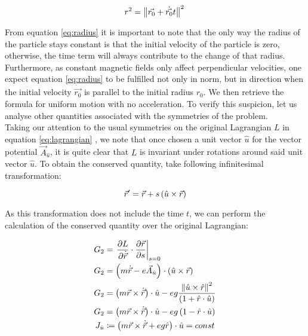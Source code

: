 \begin{equation}
r^2 = \left\lVert \vec{r_0}+\dot{\vec{r_0}}t \right\rVert^2 \\
\label{eq:radius}
\end{equation}

From equation \eqref{eq:radius} it is important to note that the only way the radius of the particle stays constant is that the initial velocity of the particle is zero, otherwise, the time term will always contribute to the change of that radius. Furthermore, as constant magnetic fields only affect perpendicular velocities, one expect equation \eqref{eq:radius} to be fulfilled not only in norm, but in direction when the initial velocity $\dot{\vec{r_0}}$ is parallel to the initial radius $r_0$. We then retrieve the formula for uniform motion with no acceleration. To verify this suspicion, let us analyse other quantities associated with the symmetries of the problem.  %
\\

Taking our attention to the usual symmetries on the original Lagrangian $L$ in equation \eqref{eq:lagrangian} , we note that once chosen a unit vector $\hat{u}$ for the vector potential  $\vec{A}_{\hat{u}}$, it is quite clear that $L$ is invariant under rotations around said unit vector $\hat{u}$. To obtain the conserved quantity, take following infinitesimal transformation:

\begin{equation}
\vec{r}' = \vec{r} + s\left( \hat{u}\times\vec{r} \right)
\label{eq:rotinv}
\end{equation}

As this transformation does not include the time $t$, we can perform the calculation of the conserved quantity over the original Lagrangian:

\begin{align*}
G_2 &= \left. \frac{\partial L}{\partial \dot{\vec{r}}}\cdot\frac{\partial \vec{r}}{\partial s} \right|_{s=0}\\
G_2 &= \left( m\dot{\vec{r}} - e\vec{A}_{\hat{u}} \right)\cdot \left( \hat{u}\times\vec{r} \right) \\
G_2 &= \left( m\vec{r}\times\dot{\vec{r}} \right)\cdot\hat{u}-eg\frac{\left\lVert \hat{u}\times\hat{r} \right\rVert^2}{\left( 1+\hat{r}\cdot\hat{u} \right)}\\
G_2 &= \left( m\vec{r}\times\dot{\vec{r}} \right)\cdot\hat{u} -eg\left( 1-\hat{r}\cdot\hat{u} \right)\\
J_{\hat{u}} &\coloneqq \left( {m\vec{r}\times\dot{\vec{r}}}+ eg\hat{r} \right)\cdot\hat{u} = const
\end{align*}

